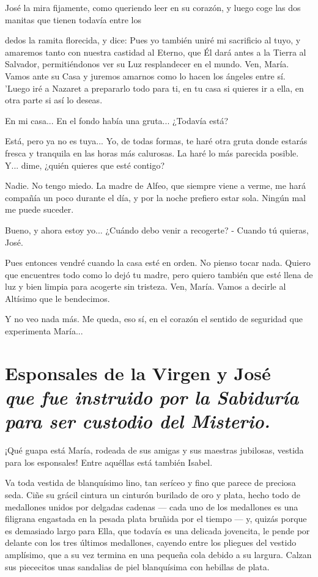 \documentclass[12pt, twoside, openright]{book} %
\begin{document}
José la mira fijamente, como queriendo leer en su corazón, y luego coge las dos manitas que tienen todavía entre los 

dedos la ramita florecida, y dice: Pues yo también uniré mi sacrificio al tuyo, y amaremos tanto con nuestra castidad al Eterno, que Él dará antes a la Tierra al Salvador, permitiéndonos ver su Luz resplandecer en el mundo. Ven, María. Vamos ante su Casa y juremos amarnos como lo hacen los ángeles entre sí. 'Luego iré a Nazaret a prepararlo todo para ti, en tu casa si quieres ir a ella, en otra parte si así lo deseas. 

En mi casa... En el fondo había una gruta... ¿Todavía está? 

Está, pero ya no es tuya... Yo, de todas formas, te haré otra gruta donde estarás fresca y tranquila en las horas más calurosas. La haré lo más parecida posible. Y... dime, ¿quién quieres que esté contigo? 

Nadie. No tengo miedo. La madre de Alfeo, que siempre viene a verme, me hará compañía un poco durante el día, y por la noche prefiero estar sola. Ningún mal me puede suceder. 

Bueno, y ahora estoy yo... ¿Cuándo debo venir a recogerte? - Cuando tú quieras, José. 

Pues entonces vendré cuando la casa esté en orden. No pienso tocar nada. Quiero que encuentres todo como lo dejó tu madre, pero quiero también que esté llena de luz y bien limpia para acogerte sin tristeza. Ven, María. Vamos a decirle al Altísimo que le bendecimos. 

Y no veo nada más. Me queda, eso sí, en el corazón el sentido de seguridad que experimenta María... 
 
\chapter*{Esponsales de la Virgen y José \\ \normalfont\normalsize\textit{que fue instruido por la Sabiduría para ser custodio del Misterio.}}
 
¡Qué guapa está María, rodeada de sus amigas y sus maestras jubilosas, vestida para los esponsales! Entre aquéllas está también Isabel. 

Va toda vestida de blanquísimo lino, tan seríceo y fino que parece de preciosa seda. Ciñe su grácil cintura un cinturón burilado de oro y plata, hecho todo de medallones unidos por delgadas cadenas — cada uno de los medallones es una filigrana engastada en la pesada plata bruñida por el tiempo — y, quizás porque es demasiado largo para Ella, que todavía es una delicada jovencita, le pende por delante con los tres últimos medallones, cayendo entre los pliegues del vestido amplísimo, que a su vez termina en una pequeña cola debido a su largura. Calzan sus piececitos unas sandalias de piel blanquísima con hebillas de plata. 
\end{document}
